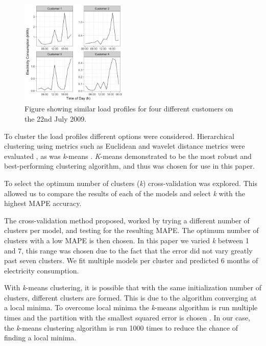 \begin{figure}[b]
	\includegraphics[width=0.45\textwidth]{Chapter5/figures/short-term-forecasting/similar_cust.png}
	\caption{Figure showing similar load profiles for four different customers on the 22nd July 2009.}
	\label{fig:similar_customers}
\end{figure}

To cluster the load profiles different options were considered. Hierarchical clustering using metrics such as Euclidean and wavelet distance metrics were evaluated \cite{BIMJ:BIMJ4710240520}, as was \textit{k}-means \cite{Forgy65}.\textit{ K}-means demonstrated to be the most robust and best-performing clustering algorithm, and thus was chosen for use in this paper.

To select the optimum number of clusters (\textit{k}) cross-validation was explored. This allowed us to compare the results of each of the models and select \textit{k} with the highest MAPE accuracy.

The cross-validation method proposed, worked by trying a different number of clusters per model, and testing for the resulting MAPE. The optimum number of clusters with a low MAPE is then chosen. In this paper we varied \textit{k} between 1 and 7, this range was chosen due to the fact that the error did not vary greatly past seven clusters. We fit multiple models per cluster and predicted 6 months of electricity consumption.

With \textit{k}-means clustering, it is possible that with the same initialization number of clusters, different clusters are formed. This is due to the algorithm converging at a local minima. To overcome local minima the \textit{k}-means algorithm is run multiple times and the partition with the smallest squared error is chosen \cite{Jain2010}. In our case, the \textit{k}-means clustering algorithm is run 1000 times to reduce the chance of finding a local minima. 

